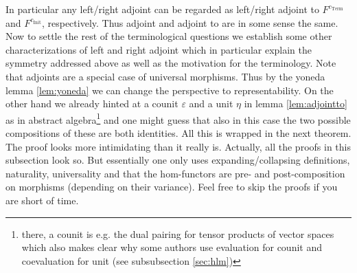In particular any left/right adjoint can be regarded as left/right adjoint to $F^{c_{\mathrm{Term}}}$ and $F^{c_{\mathrm{Init}}}$, respectively. Thus {\glqq}adjoint{\grqq} and {\glqq}adjoint to{\grqq} are in some sense the same.
\\
Now to settle the rest of the terminological questions we establish some other characterizations of left and right adjoint which in particular explain the symmetry addressed above as well as the motivation for the terminology. Note that adjoints are a special case of universal morphisms. Thus by the yoneda lemma \ref{lem:yoneda} we can change the perspective to representability. On the other hand we already hinted at a counit $\varepsilon$ and a unit $\eta$ in lemma \ref{lem:adjointto} as in abstract algebra\footnote{there, a counit is e.g. the dual pairing for tensor products of vector spaces which also makes clear why some authors use evaluation for counit and coevaluation for unit (see subsubsection \ref{sec:hlm})} and one might guess that also in this case the two possible compositions of these are both identities. All this is wrapped in the next theorem. The proof looks more intimidating than it really is. Actually, all the proofs in this subsection look so. But essentially one only uses expanding/collapsing definitions, naturality, universality and that the hom-functors are pre- and post-composition on morphisms (depending on their variance). Feel free to skip the proofs if you are short of time.
\\
